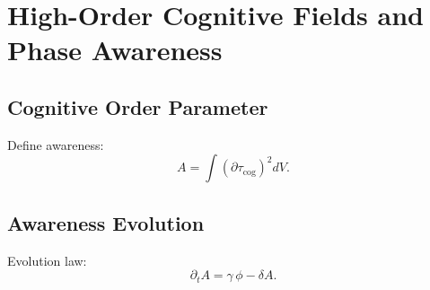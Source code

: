\chapter{High-Order Cognitive Fields and Phase Awareness}

\section{Cognitive Order Parameter}
Define awareness:
\[
A = \int (\partial\tau_{\mathrm{cog}})^2 dV.
\]

\section{Awareness Evolution}
Evolution law:
\[
\partial_t A = \gamma\,\phi - \delta A.
\]

